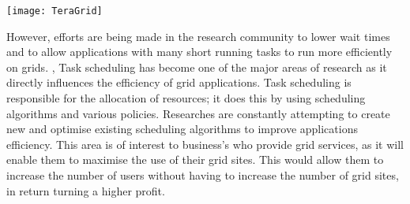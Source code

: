 \documentclass[10pt,journal,compsoc]{IEEEtran}
\begin{document}
\begin{center}
	\texttt{[image: TeraGrid]}
\end{center}

\hspace{-0.5cm}However, efforts are being made in the research community to lower wait times and to allow applications with many short running tasks to run more efficiently on grids. \cite{Falkon}, \cite{GridAndCloud}	Task scheduling has become one of the major areas of research as it directly influences the efficiency of grid applications. Task scheduling is responsible for the allocation of resources; it does this by using scheduling algorithms and various policies. Researches are constantly attempting to create new and optimise existing scheduling algorithms to improve applications efficiency. This area is of interest to business's who provide grid services, as it will enable them to maximise the use of their grid sites. This would allow them to increase the number of users without having to increase the number of grid sites, in return turning a higher profit. \cite{tasks} \newline \newline \newline
\end{document}

